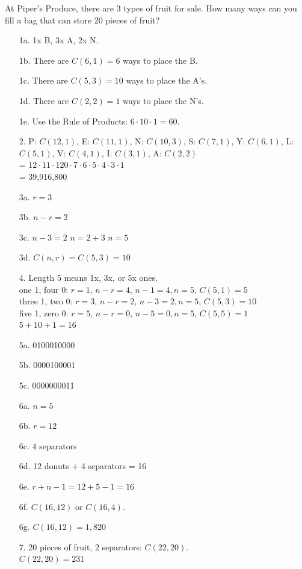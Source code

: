 {    \hrulefill

    \begin{questionNOGRADE}{\thequestion}
        At Piper's Produce, there are 3 types of fruit for sale.
        How many ways can you fill a bag that can store 20 pieces of fruit?
    \end{questionNOGRADE}
}{
    \begin{itemize}
		\item[1a.]	1x B, 3x A, 2x N.
		\item[1b.]	There are $C(6,1) = 6$ ways to place the B.
		\item[1c.]	There are $C(5,3) = 10$ ways to place the A's.
		\item[1d.]	There are $C(2,2) = 1$ ways to place the N's.
		\item[1e.]	Use the Rule of Products: $6 \cdot 10 \cdot 1 = 60$.
		
		\item[2.]	P: $C(12,1)$, E: $C(11,1)$, N: $C(10,3)$, S: $C(7,1)$, Y: $C(6,1)$, L: $C(5,1)$, V: $C(4,1)$, I: $C(3,1)$, A: $C(2,2)$ \\
					= $12 \cdot 11 \cdot 120 \cdot 7 \cdot 6 \cdot 5 \cdot 4 \cdot 3 \cdot 1$ \\
					= 39,916,800
                    
        \item[3a.]	$r = 3$
        \item[3b.]	$n-r = 2$
        \item[3c.]	$n-3 = 2$ \tab $n = 2 + 3$ \tab $n = 5$
        \item[3d.]	$C(n,r) = C(5,3) = 10$
        
        \item[4.]	Length 5 means 1x, 3x, or 5x ones.
					\\ one 1, four 0:	$r = 1$, $n-r = 4$, $n-1=4, n=5$, $C(5,1) = 5$
					\\ three 1, two 0:	$r = 3$, $n-r = 2$, $n-3=2, n=5$, $C(5,3) = 10$
					\\ five 1, zero 0:	$r = 5$, $n-r = 0$, $n-5=0, n=5$, $C(5,5) = 1$
					\\ $5 + 10 + 1 = 16$
		

        \item[5a.]  0100010000
        \item[5b.]  0000100001
        \item[5c.]  0000000011

        \item[6a.]  $n = 5$
        \item[6b.]  $r = 12$
        \item[6c.]  4 separators
        \item[6d.]  12 donuts + 4 separators = 16
        \item[6e.]  $r + n - 1 = 12 + 5 - 1 = 16$
        \item[6f.]  $C(16,12)$ or $C(16,4)$.
        \item[6g.]  $C(16,12) = 1,820$

        \item[7.]   20 pieces of fruit, 2 separators: $C(22,20)$. \\
                    $C(22,20) = 231$
    \end{itemize}
}


